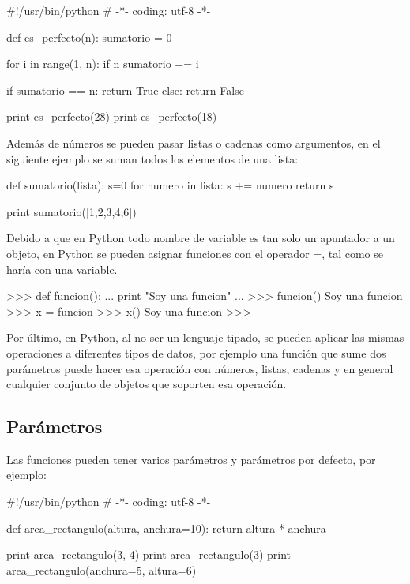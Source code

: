 \begin{pyglist} [language=python]
#!/usr/bin/python
# -*- coding: utf-8 -*-

def es_perfecto(n):
    sumatorio = 0
    
    for i in range(1, n):
        if n %
            sumatorio += i

    if sumatorio == n:
        return True
    else:
        return False

print es_perfecto(28)
print es_perfecto(18)
\end{pyglist}

Además de números se pueden pasar listas o cadenas como argumentos, en el siguiente ejemplo se suman todos los elementos de una lista:\\

\begin{pyglist} [language=python]
def sumatorio(lista):
    s=0
    for numero in lista:
        s += numero
    return s

print sumatorio([1,2,3,4,6])
\end{pyglist}

Debido a que en Python todo nombre de variable es tan solo un apuntador a un objeto, en Python se pueden asignar funciones con el operador =, tal como se haría con una variable.\\

\begin{pyglist} [language=python]
>>> def funcion():
...     print "Soy una funcion"
... 
>>> funcion()
Soy una funcion
>>> x = funcion
>>> x()
Soy una funcion
>>> 
\end{pyglist}

Por último, en Python, al no ser un lenguaje tipado, se pueden aplicar las mismas operaciones a diferentes tipos de datos, por ejemplo una función que sume dos parámetros puede hacer esa operación con números, listas, cadenas y en general cualquier conjunto de objetos que soporten esa operación.


\subsection{Parámetros}

Las funciones pueden tener varios parámetros y parámetros por defecto, por ejemplo:\\

\begin{pyglist} [language=python]
#!/usr/bin/python
# -*- coding: utf-8 -*-

def area_rectangulo(altura, anchura=10):
    return altura * anchura 
    
print area_rectangulo(3, 4)
print area_rectangulo(3)
print area_rectangulo(anchura=5, altura=6)
\end{pyglist}

